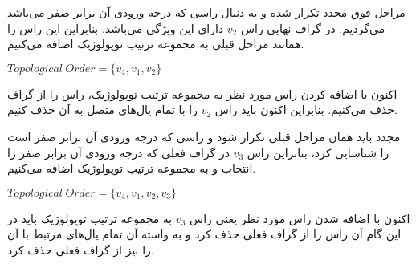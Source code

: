 \documentclass[a4paper,10pt]{article}
\begin{document}
    مراحل فوق مجدد تکرار شده و به دنبال راسی که درجه ورودی آن برابر صفر می‌باشد می‌گردیم. در گراف نهایی راس $v_2$ دارای این ویژگی می‌باشد. بنابراین این راس را همانند مراحل قبلی به مجموعه ترتیب توپولوژیک اضافه می‌کنیم.

    \begin{center}
        
        $Topological \hspace{3pt} Order = \{v_4, v_1, v_2\}$

    \end{center}

    اکنون با اضافه کردن راس مورد نظر به مجموعه ترتیب توپولوژیک، راس را از گراف حذف می‌کنیم. بنابراین اکنون باید راس $v_2$ را با تمام یال‌های متصل به آن حذف کنیم.

    \begin{center}
        

    \end{center} 

    مجدد باید همان مراحل قبلی تکرار شود و راسی که درجه ورودی آن برابر صفر است را شناسایی کرد، بنابراین راس $v_3$ در گراف فعلی که درجه ورودی آن برابر صفر را  انتخاب و به مجموعه ترتیب توپولوژیک اضافه می‌‌کنیم.

    \begin{center}
        
        $Topological \hspace{3pt} Order = \{v_4, v_1, v_2, v_3\}$

    \end{center}

    اکنون با اضافه شدن راس مورد نظر یعنی راس $v_3$ به مجموعه ترتیب توپولوژیک باید در این گام آن راس را از گراف فعلی حذف کرد و به واسته آن تمام یال‌های مرتبط با آن را نیز از گراف فعلی حذف کرد.

    \begin{center}
        

    \end{center}
\end{document}

